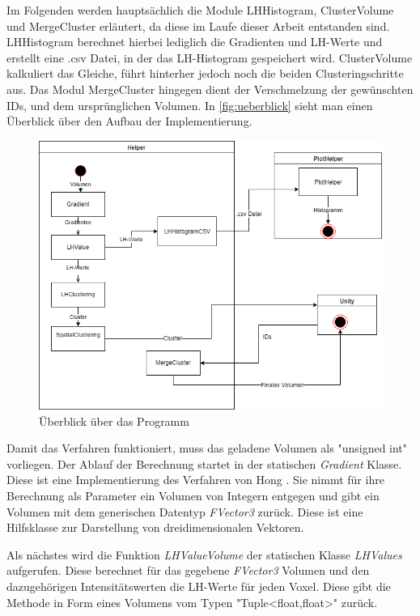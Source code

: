 Im Folgenden werden hauptsächlich die Module LHHistogram, ClusterVolume und MergeCluster erläutert, da diese im Laufe dieser Arbeit entstanden sind. LHHistogram berechnet hierbei lediglich die Gradienten und LH-Werte und erstellt eine .csv Datei, in der das LH-Histogram gespeichert wird. ClusterVolume kalkuliert das Gleiche, führt hinterher jedoch noch die beiden Clusteringschritte aus. Das Modul MergeCluster hingegen dient der Verschmelzung der gewünschten IDs, und dem ursprünglichen Volumen. In \autoref{fig:ueberblick} sieht man einen Überblick über den Aufbau der Implementierung.

\begin{figure}
\centering 
\includegraphics[width=\textwidth]{Logos/Ueberblick.png}
\caption{Überblick über das Programm} 
\label{fig:ueberblick} 
\end{figure}


Damit das Verfahren funktioniert, muss das geladene Volumen als "unsigned int" vorliegen. Der Ablauf der Berechnung startet in der statischen \textit{Gradient} Klasse. Diese ist eine Implementierung des Verfahren von Hong \cite{hong2003method}. Sie nimmt für ihre Berechnung als Parameter ein Volumen von Integern entgegen und gibt ein Volumen mit dem generischen Datentyp \textit{FVector3} zurück. Diese ist eine Hilfsklasse zur Darstellung von dreidimensionalen Vektoren.

Als nächstes wird die Funktion \textit{LHValueVolume} der statischen Klasse \textit{LHValues} aufgerufen. Diese berechnet für das gegebene \textit{FVector3} Volumen und den dazugehörigen Intensitätswerten die LH-Werte für jeden Voxel. Diese gibt die Methode in Form eines Volumens vom Typen "Tuple<float,float>" zurück.

